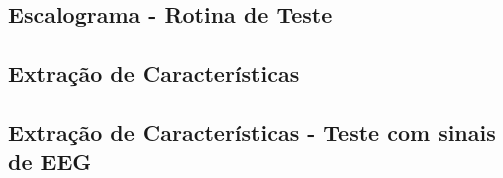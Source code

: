 \documentclass{article}
\begin{document}
\subsection*{Escalograma - Rotina de Teste}


\subsection*{Extração de Características}

\subsection*{Extração de Características - Teste com sinais de EEG}

\end{document}
